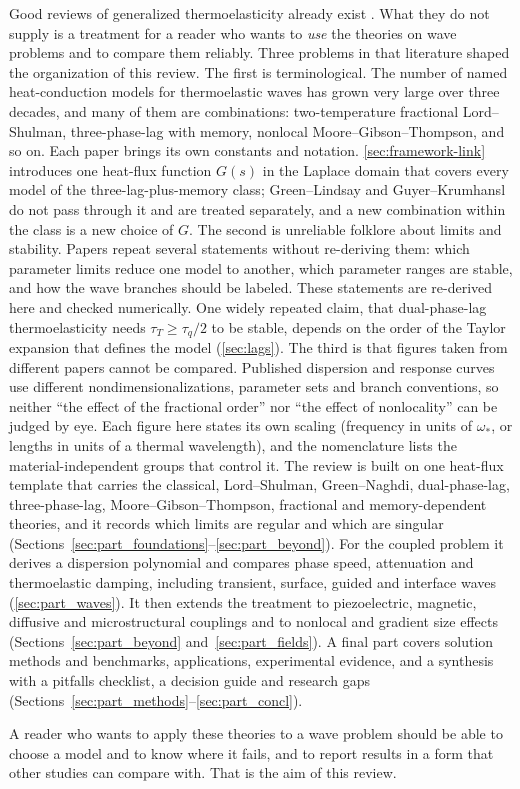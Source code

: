 Good reviews of generalized thermoelasticity already exist \citep{Chandrasekharaiah1986,Chandrasekharaiah1998,HetnarskiIgnaczak1999,HetnarskiIgnaczak2000,Shakeriaski2021,Huang2025}. What they do not supply is a treatment for a reader who wants to \emph{use} the theories on wave problems and to compare them reliably. Three problems in that literature shaped the organization of this review.
The first is terminological. The number of named heat-conduction models for thermoelastic waves has grown very large over three decades, and many of them are combinations: two-temperature fractional Lord--Shulman, three-phase-lag with memory, nonlocal Moore--Gibson--Thompson, and so on. Each paper brings its own constants and notation. \cref{sec:framework-link} introduces one heat-flux function $G(s)$ in the Laplace domain that covers every model of the three-lag-plus-memory class; Green--Lindsay and Guyer--Krumhansl do not pass through it and are treated separately, and a new combination within the class is a new choice of $G$.
The second is unreliable folklore about limits and stability. Papers repeat several statements without re-deriving them: which parameter limits reduce one model to another, which parameter ranges are stable, and how the wave branches should be labeled. These statements are re-derived here and checked numerically. One widely repeated claim, that dual-phase-lag thermoelasticity needs $\tau_T\ge\tau_q/2$ to be stable, depends on the order of the Taylor expansion that defines the model (\cref{sec:lags}).
The third is that figures taken from different papers cannot be compared. Published dispersion and response curves use different nondimensionalizations, parameter sets and branch conventions, so neither ``the effect of the fractional order'' nor ``the effect of nonlocality'' can be judged by eye. Each figure here states its own scaling (frequency in units of $\omega_*$, or lengths in units of a thermal wavelength), and the nomenclature lists the material-independent groups that control it.
The review is built on one heat-flux template that carries the classical, Lord--Shulman, Green--Naghdi, dual-phase-lag, three-phase-lag, Moore--Gibson--Thompson, fractional and memory-dependent theories, and it records which limits are regular and which are singular (Sections~\ref{sec:part_foundations}--\ref{sec:part_beyond}). For the coupled problem it derives a dispersion polynomial and compares phase speed, attenuation and thermoelastic damping, including transient, surface, guided and interface waves (\cref{sec:part_waves}). It then extends the treatment to piezoelectric, magnetic, diffusive and microstructural couplings and to nonlocal and gradient size effects (Sections~\ref{sec:part_beyond} and~\ref{sec:part_fields}). A final part covers solution methods and benchmarks, applications, experimental evidence, and a synthesis with a pitfalls checklist, a decision guide and research gaps (Sections~\ref{sec:part_methods}--\ref{sec:part_concl}).

A reader who wants to apply these theories to a wave problem should be able to choose a model and to know where it fails, and to report results in a form that other studies can compare with. That is the aim of this review.
